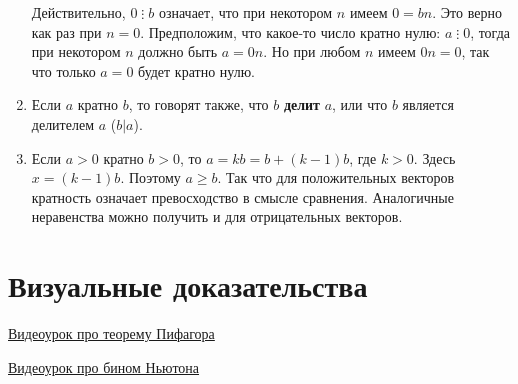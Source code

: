 \begin{enumerate}
Действительно, $0\mathop{\vdots} b$ означает, что при некотором $n$ имеем $0=bn$. Это верно как раз при $n=0$. Предположим, что какое-то число кратно нулю: $a\mathop{\vdots} 0$, тогда при некотором $n$ должно быть $a=0n$. Но при любом $n$ имеем $0n=0$, так что только $a=0$ будет кратно нулю.

\item Если $a$ кратно $b$, то говорят также, что $b$ \textbf{делит} $a$, или что $b$ является делителем $a$ ($b|a$).
\item Если $a>0$ кратно $b>0$, то $a=kb=b+(k-1)b$, где $k>0$. Здесь $x=(k-1)b$. Поэтому $a\ge b$. Так что для положительных векторов кратность означает превосходство в смысле сравнения. Аналогичные неравенства можно получить и для отрицательных векторов.
\end{enumerate}

\section{Визуальные доказательства}\label{vizual}

\href{https://www.youtube.com/watch?v=Xdc8WWFURA8}{Видеоурок про теорему Пифагора}

\href{https://www.youtube.com/watch?v=YXYQmxLDtMw}{Видеоурок про бином Ньютона}

